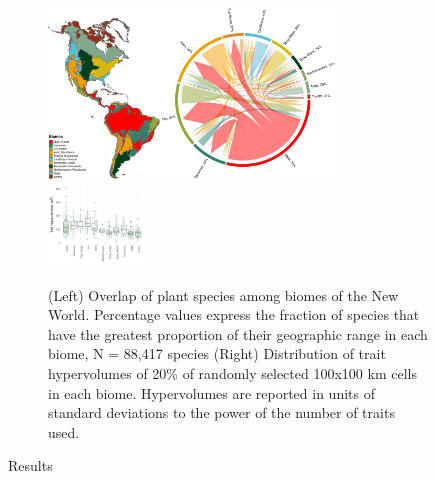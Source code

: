 \documentclass[final]{beamer}
\newlength{\sepwid}
\newlength{\onecolwid}
\newlength{\twocolwid}
\begin{document}
\begin{frame}[t]
\begin{columns}[t]
\begin{column}{\onecolwid}
    \end{column}



    \begin{column}{\sepwid}\end{column}			%
    \begin{column}{\twocolwid}							%

\begin{figure}[h]
	\centering
	\includegraphics[width=0.75\textwidth]{./figures/Figure1.pdf}
	~
	\includegraphics[width=0.25\textwidth]{./figures/Hypervolume_sp_sample_gaussian20perc.pdf}
	\caption{ \footnotesize (Left) Overlap of plant species among biomes of the New World. Percentage values express the fraction of species that have the greatest proportion of their geographic range in each biome, N = 88,417 species (Right) Distribution of trait hypervolumes of 20\% of randomly selected 100x100 km cells in each biome. Hypervolumes are reported in units of standard deviations to the power of the number of traits used.}
	\label{fig:map}
\end{figure}



\begin{block}{Results}

\end{block}

\setlength{\columnsep}{30pt}		 
\begin{multicols}{2}{}


\end{multicols}
\end{column}
\end{columns}
\end{frame}
\end{document}
